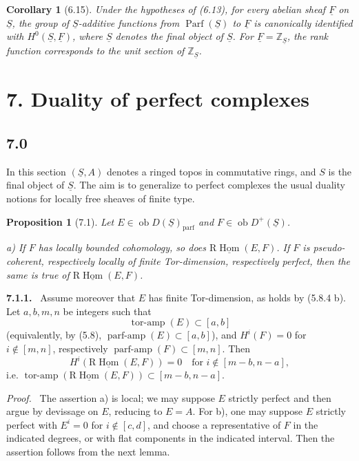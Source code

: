 \documentclass[13pt]{extarticle}
\newcommand{\ZZ}{\mathbb Z}
\newcommand{\uS}{\underline S}
\newcommand{\uF}{\underline F}
\newcommand{\ob}{\operatorname{ob}}
\newcommand{\RHom}{\mathrm R\underline{\operatorname{Hom}}}
\newcommand{\Parf}{\operatorname{Parf}}
\newenvironment{statement}[1]{\par\medskip\noindent\textbf{#1.}\ }{\par\medskip}
\newenvironment{prooftext}[1][Proof]{\par\noindent\emph{#1.}\ }{\par\medskip}
\newtheorem*{proposition*}{Proposition}
\newtheorem*{corollary*}{Corollary}
\begin{document}
\begin{corollary*}[6.15]
Under the hypotheses of (6.13), for every abelian sheaf $\uF$ on $\uS$, the group of $\uS$-additive functions from $\Parf(\uS)$ to $\uF$ is canonically identified with $H^0(\uS,\uF)$, where $\uS$ denotes the final object of $\uS$. For $\uF=\ZZ_{\uS}$, the rank function corresponds to the unit section of $\ZZ_{\uS}$.
\end{corollary*}

\section*{7. Duality of perfect complexes}

\subsection*{7.0}
In this section $(\uS,A)$ denotes a ringed topos in commutative rings, and $S$ is the final object of $\uS$. The aim is to generalize to perfect complexes the usual duality notions for locally free sheaves of finite type.

\begin{proposition*}[7.1]
Let $E\in\ob D(\uS)_{\mathrm{parf}}$ and $F\in\ob D^+(\uS)$.

\textup{a)} If $F$ has locally bounded cohomology, so does $\RHom(E,F)$. If $F$ is pseudo-coherent, respectively locally of finite Tor-dimension, respectively perfect, then the same is true of $\RHom(E,F)$.
\end{proposition*}

\begin{statement}{7.1.1}
Assume moreover that $E$ has finite Tor-dimension, as holds by (5.8.4 b). Let $a,b,m,n$ be integers such that
\[
\operatorname{tor\text{-}amp}(E)\subset[a,b]
\]
(equivalently, by (5.8), $\operatorname{parf\text{-}amp}(E)\subset[a,b]$), and $H^i(F)=0$ for $i\notin[m,n]$, respectively $\operatorname{parf\text{-}amp}(F)\subset[m,n]$. Then
\[
H^i(\RHom(E,F))=0\quad\text{for }i\notin[m-b,n-a],
\]
i.e. $\operatorname{tor\text{-}amp}(\RHom(E,F))\subset[m-b,n-a]$.
\end{statement}

\begin{prooftext}
The assertion a) is local; we may suppose $E$ strictly perfect and then argue by devissage on $E$, reducing to $E=A$. For b), one may suppose $E$ strictly perfect with $E^i=0$ for $i\notin[c,d]$, and choose a representative of $F$ in the indicated degrees, or with flat components in the indicated interval. Then the assertion follows from the next lemma.
\end{prooftext}
\end{document}

